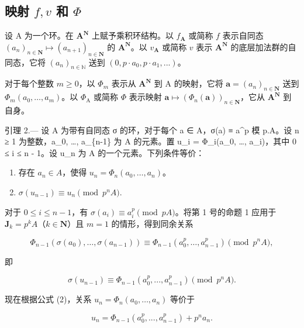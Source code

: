 \subsection{\texorpdfstring{映射 \(f, v\) 和 \(\Phi\)}{映射 f、v 和 Φ}}

  设 A 为一个环。在 \(\mathbf{A}^{\mathbf{N}}\) 上赋予乘积环结构。以 \(f_{\mathbf{A}}\) 或简称 \(f\) 表示自同态 \((a_{n})_{n\in\mathbf{N}}\mapsto(a_{n+1})_{n\in\mathbf{N}}\) 的 \(\mathbf{A}^{\mathbf{N}}\)。以 \(v_{\mathbf{A}}\) 或简称 \(v\) 表示 \(\mathbf{A}^{\mathbf{N}}\) 的底层加法群的自同态，它将 \((a_{n})_{n\in\mathbb{N}}\) 送到 \((0,p\cdot a_{0},p\cdot a_{1},...)\)。

  对于每个整数 \(m \geqslant 0\)，以 \(\Phi_{m}\) 表示从 \(\mathbf{A}^{\mathbf{N}}\) 到 A 的映射，它将 \(\boldsymbol{a} = (a_{n})_{n \in \mathbf{N}}\) 送到 \(\Phi_{m}(a_{0}, \ldots, a_{m})\)。以 \(\Phi_{\mathrm{A}}\) 或简称 \(\Phi\) 表示映射 \(\boldsymbol{a} \mapsto (\Phi_{n}(\boldsymbol{a}))_{n \in \mathbf{N}}\)，它从 \(\mathbf{A}^{\mathbf{N}}\) 到自身。

引理 2.--- 设 A 为带有自同态 σ 的环，对于每个 a ∈ A，σ(a) ≡ a\^{}p 模 p.A。设 n ≥ 1 为整数，a\_0, \ldots, a\_\{n-1\} 为 A 的元素。置 u\_i = Φ\_i(a\_0, \ldots, a\_i)，其中 0 ≤ i ≤ n - 1。设 u\_n 为 A 的一个元素。下列条件等价：

\begin{enumerate}
\def\labelenumi{\alph{enumi})}
\item
  存在 \(a_{n} \in A\)，使得 \(u_{n} = \Phi_{n}(a_{0}, \ldots, a_{n})\)。
\item
  \(\sigma(u_{n-1}) \equiv u_n \pmod{p^nA}\).
\end{enumerate}

对于 \(0 \leqslant i \leqslant n - 1\)，有 \(\sigma(a_i) \equiv a_i^p \pmod{pA}\)。将第 1 号的命题 1 应用于 \(\mathbf{J}_k = p^kA\)（\(k \in \mathbf{N}\)）且 \(m = 1\) 的情形，得到同余关系

\[
\Phi_ {n - 1} \left(\sigma \left(a _ {0}\right), \dots , \sigma \left(a _ {n - 1}\right)\right) \equiv \Phi_ {n - 1} \left(a _ {0} ^ {p}, \dots , a _ {n - 1} ^ {p}\right) \pmod{p ^ {n}A},\tag{7}
\]

即

\[
\sigma (u _ {n - 1}) \equiv \Phi_ {n - 1} (a _ {0} ^ {p},..., a _ {n - 1} ^ {p}) \pmod{p ^ {n}A}.\tag{8}
\]

现在根据公式 (2)，关系 \(u_n = \Phi_n(a_0, \ldots, a_n)\) 等价于

\[
u _ {n} = \Phi_ {n - 1} (a _ {0} ^ {p},..., a _ {n - 1} ^ {p}) + p ^ {n} a _ {n}.\tag{9}
\]

